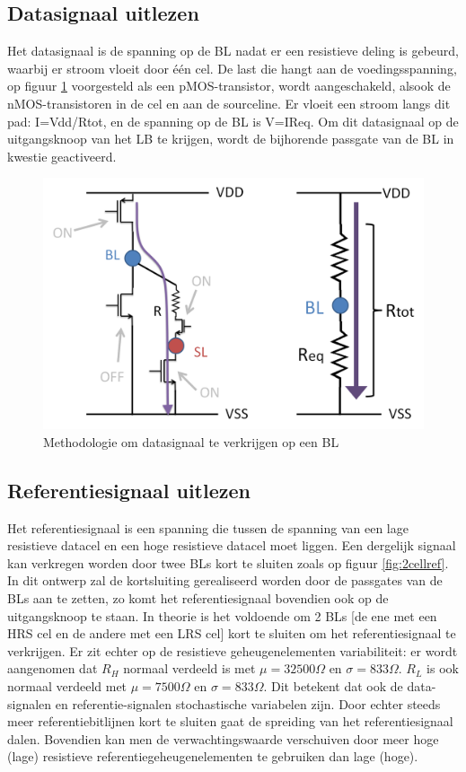 \subsection{Datasignaal uitlezen}
Het datasignaal is de spanning op de BL nadat er een resistieve deling is gebeurd, waarbij er stroom vloeit door één cel. De last die hangt aan de voedingsspanning, op figuur \ref{fig:dataread} voorgesteld als een pMOS-transistor, wordt aangeschakeld, alsook de nMOS-transistoren in de cel en aan de sourceline. Er vloeit een stroom langs dit pad: I=Vdd/Rtot, en de spanning op de BL is V=IReq. Om dit datasignaal op de uitgangsknoop van het LB te krijgen, wordt de bijhorende passgate van de BL in kwestie geactiveerd.

\begin{figure}
  \centering
  \includegraphics[scale=0.3]{../fig/hfdstk-architecture-datasignal.png}
  \caption{Methodologie om datasignaal te verkrijgen op een BL}
  \label{fig:dataread}
\end{figure}

\subsection{Referentiesignaal uitlezen}
Het referentiesignaal is een spanning die tussen de spanning van een lage resistieve datacel en een hoge resistieve datacel moet liggen. Een dergelijk signaal kan verkregen worden door twee BLs kort te sluiten zoals op figuur \ref{fig:2cellref}. In dit ontwerp zal de kortsluiting gerealiseerd worden door de passgates van de BLs aan te zetten, zo komt het referentiesignaal bovendien ook op de uitgangsknoop te staan. In theorie is het voldoende om 2 BLs [de ene met een HRS cel en de andere met een LRS cel] kort te sluiten om het referentiesignaal te verkrijgen. Er zit echter op de resistieve geheugenelementen variabiliteit: er wordt aangenomen dat $R_{H}$ normaal verdeeld is met $\mu = 32500\Omega$ en $\sigma = 833\Omega$. $R_{L}$ is ook normaal verdeeld met $\mu = 7500\Omega$ en $\sigma = 833\Omega$. Dit betekent dat ook de data-signalen en referentie-signalen stochastische variabelen zijn.
Door echter steeds meer referentiebitlijnen kort te sluiten gaat de spreiding van het referentiesignaal dalen. Bovendien kan men de verwachtingswaarde verschuiven door meer hoge (lage) resistieve referentiegeheugenelementen te gebruiken dan lage (hoge).

